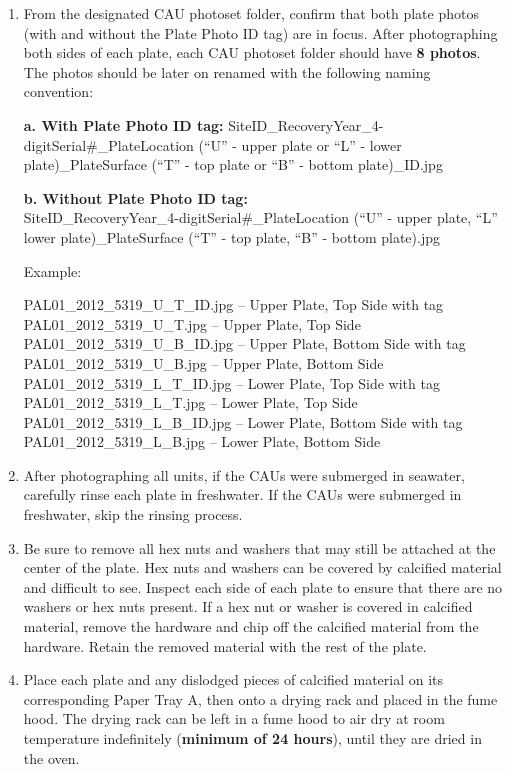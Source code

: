 \documentclass[
]{book}
\begin{document}
\begin{enumerate}
\def\labelenumi{\arabic{enumi}.}
\setcounter{enumi}{8}
\item
  From the designated CAU photoset folder, confirm that both plate photos (with and without the Plate Photo ID tag) are in focus. After photographing both sides of each plate, each CAU photoset folder should have \textbf{8 photos}. The photos should be later on renamed with the following naming convention:

  \textbf{a. With Plate Photo ID tag:}
  SiteID\_RecoveryYear\_4-digitSerial\#\_PlateLocation (``U'' - upper plate or ``L'' - lower plate)\_PlateSurface (``T'' - top plate or ``B'' - bottom plate)\_ID.jpg

  \textbf{b. Without Plate Photo ID tag:}\\
  SiteID\_RecoveryYear\_4-digitSerial\#\_PlateLocation (``U'' - upper plate, ``L'' lower plate)\_PlateSurface (``T'' - top plate, ``B'' - bottom plate).jpg

  Example:

  PAL01\_2012\_5319\_U\_T\_ID.jpg -- Upper Plate, Top Side with tag\\
  PAL01\_2012\_5319\_U\_T.jpg -- Upper Plate, Top Side\\
  PAL01\_2012\_5319\_U\_B\_ID.jpg -- Upper Plate, Bottom Side with tag\\
  PAL01\_2012\_5319\_U\_B.jpg -- Upper Plate, Bottom Side\\
  PAL01\_2012\_5319\_L\_T\_ID.jpg -- Lower Plate, Top Side with tag\\
  PAL01\_2012\_5319\_L\_T.jpg -- Lower Plate, Top Side\\
  PAL01\_2012\_5319\_L\_B\_ID.jpg -- Lower Plate, Bottom Side with tag\\
  PAL01\_2012\_5319\_L\_B.jpg -- Lower Plate, Bottom Side
\item
  After photographing all units, if the CAUs were submerged in seawater, carefully rinse each plate in freshwater. If the CAUs were submerged in freshwater, skip the rinsing process.
\item
  Be sure to remove all hex nuts and washers that may still be attached at the center of the plate. Hex nuts and washers can be covered by calcified material and difficult to see. Inspect each side of each plate to ensure that there are no washers or hex nuts present. If a hex nut or washer is covered in calcified material, remove the hardware and chip off the calcified material from the hardware. Retain the removed material with the rest of the plate.
\item
  Place each plate and any dislodged pieces of calcified material on its corresponding Paper Tray A, then onto a drying rack and placed in the fume hood. The drying rack can be left in a fume hood to air dry at room temperature indefinitely (\textbf{minimum of 24 hours}), until they are dried in the oven.
\end{enumerate}
\end{document}
